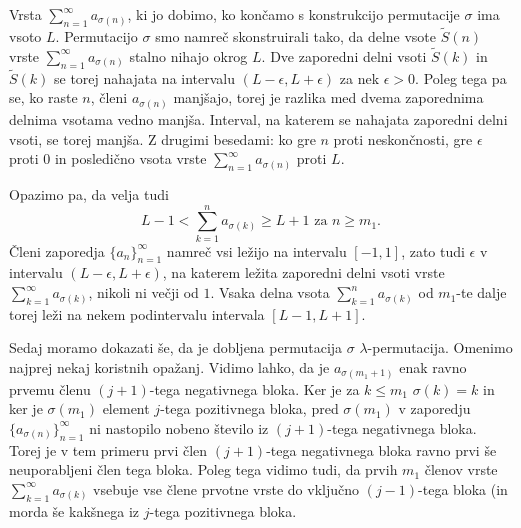 \documentclass[12pt,a4paper,reqno]{amsart}
\theoremstyle{definition} %
\theoremstyle{plain} %
\begin{document}
Vrsta $\sum^{\infty}_{n=1}a_{\sigma(n)}$, ki jo dobimo, ko končamo s konstrukcijo permutacije $\sigma$ ima vsoto $L$. Permutacijo $\sigma$ smo namreč skonstruirali tako, da delne vsote $\tilde{S}(n)$ vrste $\sum^{\infty}_{n=1}a_{\sigma(n)}$ stalno nihajo okrog $L$. Dve zaporedni delni vsoti $\tilde{S}(k)$ in $\tilde{S}(k)$ se torej nahajata na intervalu $(L-\epsilon, L+\epsilon)$ za nek $\epsilon > 0$. Poleg tega pa se, ko raste $n$, členi $a_{\sigma(n)}$ manjšajo, torej je razlika med dvema zaporednima delnima vsotama vedno manjša. Interval, na katerem se nahajata zaporedni delni vsoti, se torej manjša. Z drugimi besedami: ko gre $n$ proti neskončnosti, gre $\epsilon$ proti $0$ in posledično vsota vrste $\sum^{\infty}_{n=1}a_{\sigma(n)}$ proti $L$.

Opazimo pa, da velja tudi $$L-1<\sum_{k=1}^{n}a_{\sigma(k)} \geq L+1\textrm{ za }n\geq m_1.$$ Členi zaporedja $\{a_n\}_{n=1}^{\infty}$ namreč vsi ležijo na intervalu $[-1,1]$, zato tudi $\epsilon$ v intervalu $(L-\epsilon, L+\epsilon)$, na katerem ležita zaporedni delni vsoti vrste $\sum_{k=1}^{\infty}a_{\sigma(k)}$, nikoli ni večji od $1$. Vsaka delna vsota $\sum_{k=1}^{n}a_{\sigma(k)}$ od $m_1$-te dalje torej leži na nekem podintervalu intervala $[L-1,L+1]$. %

Sedaj moramo dokazati še, da je dobljena permutacija $\sigma$ $\lambda$-permutacija. Omenimo najprej nekaj koristnih opažanj. Vidimo lahko, da je $a_{\sigma(m_1+1)}$ enak ravno prvemu členu $(j+1)$-tega negativnega bloka. Ker je za $k \leq m_1$ $\sigma(k)=k$ in ker je $\sigma(m_1)$ element $j$-tega pozitivnega bloka, pred $\sigma(m_1)$ v zaporedju $\{a_{\sigma(n)}\}_{n=1}^{\infty}$ ni nastopilo nobeno število iz $(j+1)$-tega negativnega bloka. Torej je v tem primeru prvi člen $(j+1)$-tega negativnega bloka ravno prvi še neuporabljeni člen tega bloka. Poleg tega vidimo tudi, da prvih $m_1$ členov vrste $\sum_{k=1}^{\infty}a_{\sigma(k)}$ vsebuje vse člene prvotne vrste do vključno $(j-1)$-tega bloka (in morda še kakšnega iz $j$-tega pozitivnega bloka.
\end{document}
